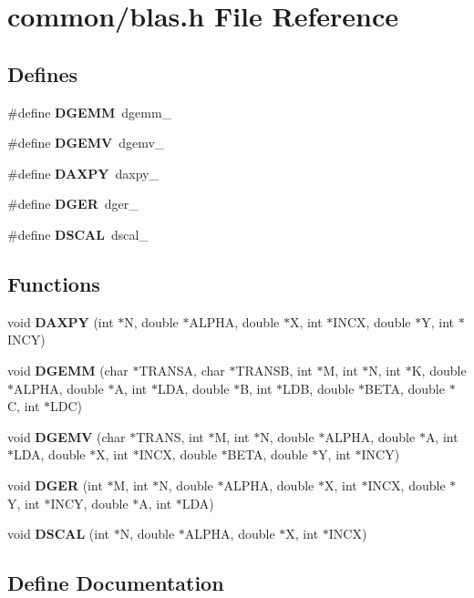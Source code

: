 \section{common/blas.h File Reference}
\label{blas_8h}


\subsection*{Defines}
\begin{CompactItemize}
\item 
\#define {\bf DGEMM}~dgemm\_\-
\item 
\#define {\bf DGEMV}~dgemv\_\-
\item 
\#define {\bf DAXPY}~daxpy\_\-
\item 
\#define {\bf DGER}~dger\_\-
\item 
\#define {\bf DSCAL}~dscal\_\-
\end{CompactItemize}
\subsection*{Functions}
\begin{CompactItemize}
\item 
void {\bf DAXPY} (int $\ast$N, double $\ast$ALPHA, double $\ast$X, int $\ast$INCX, double $\ast$Y, int $\ast$INCY)
\item 
void {\bf DGEMM} (char $\ast$TRANSA, char $\ast$TRANSB, int $\ast$M, int $\ast$N, int $\ast$K, double $\ast$ALPHA, double $\ast$A, int $\ast$LDA, double $\ast$B, int $\ast$LDB, double $\ast$BETA, double $\ast$C, int $\ast$LDC)
\item 
void {\bf DGEMV} (char $\ast$TRANS, int $\ast$M, int $\ast$N, double $\ast$ALPHA, double $\ast$A, int $\ast$LDA, double $\ast$X, int $\ast$INCX, double $\ast$BETA, double $\ast$Y, int $\ast$INCY)
\item 
void {\bf DGER} (int $\ast$M, int $\ast$N, double $\ast$ALPHA, double $\ast$X, int $\ast$INCX, double $\ast$Y, int $\ast$INCY, double $\ast$A, int $\ast$LDA)
\item 
void {\bf DSCAL} (int $\ast$N, double $\ast$ALPHA, double $\ast$X, int $\ast$INCX)
\end{CompactItemize}


\subsection{Define Documentation}
